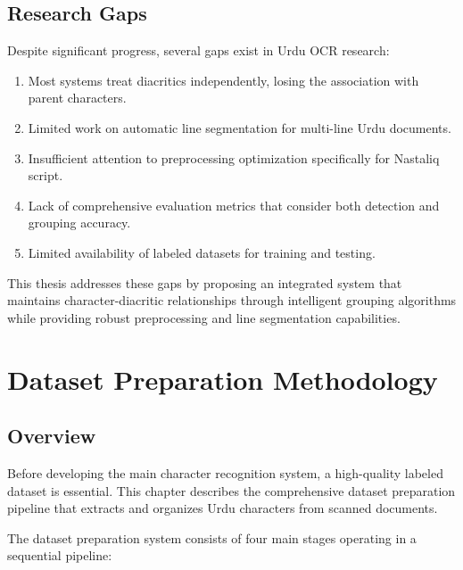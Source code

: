 \documentclass[12pt,a4paper,oneside]{report}
\begin{document}
\section{Research Gaps}

Despite significant progress, several gaps exist in Urdu OCR research:

\begin{enumerate}
    \item Most systems treat diacritics independently, losing the association with parent characters.
    
    \item Limited work on automatic line segmentation for multi-line Urdu documents.
    
    \item Insufficient attention to preprocessing optimization specifically for Nastaliq script.
    
    \item Lack of comprehensive evaluation metrics that consider both detection and grouping accuracy.
    
    \item Limited availability of labeled datasets for training and testing.
\end{enumerate}

This thesis addresses these gaps by proposing an integrated system that maintains character-diacritic relationships through intelligent grouping algorithms while providing robust preprocessing and line segmentation capabilities.

\chapter{Dataset Preparation Methodology}

\section{Overview}

Before developing the main character recognition system, a high-quality labeled dataset is essential. This chapter describes the comprehensive dataset preparation pipeline that extracts and organizes Urdu characters from scanned documents.

The dataset preparation system consists of four main stages operating in a sequential pipeline:
\end{document}
